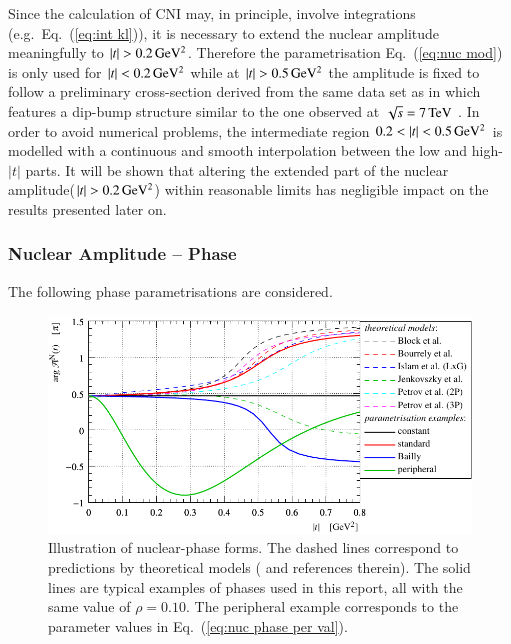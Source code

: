 Since the calculation of CNI may, in principle, involve integrations (e.g.~Eq.~(\ref{eq:int kl})), it is necessary to extend the nuclear amplitude meaningfully to $|t| > 0.2\,{\rm GeV^2}$. Therefore the parametrisation Eq.~(\ref{eq:nuc mod}) is only used for $|t| < 0.2\,{\rm GeV^2}$ while at $|t| > 0.5\,{\rm GeV^2}$ the amplitude is fixed to follow a preliminary cross-section derived from the same data set as in \cite{8tev-90m} which features a dip-bump structure similar to the one observed at $\sqrt{s} = 7\,{\rm TeV}$ \cite{epl95}. In order to avoid numerical problems, the intermediate region $0.2 < |t| < 0.5\,{\rm GeV^2}$ is modelled with a continuous and smooth interpolation between the low and high-$|t|$ parts. It will be shown that altering the extended part of the nuclear amplitude\Break ($|t| > 0.2\,{\rm GeV^2}$) within reasonable limits has negligible impact on the results presented later on.



\subsubsection{Nuclear Amplitude -- Phase}
\label{sec:cni nuclear phase}

The following phase parametrisations are considered.

\begin{figure}
\begin{center}
\includegraphics{fig/hadronic_phase_illustration.pdf}
\caption{Illustration of nuclear-phase forms. The dashed lines correspond to predictions by theoretical models (\cite{elegent} and references therein). The solid lines are typical examples of phases used in this report, all with the same value of $\rho = 0.10$. The peripheral example corresponds to the parameter values in Eq.~(\ref{eq:nuc phase per val}).
}
\label{fig:phase illustration}
\end{center}
\end{figure}

